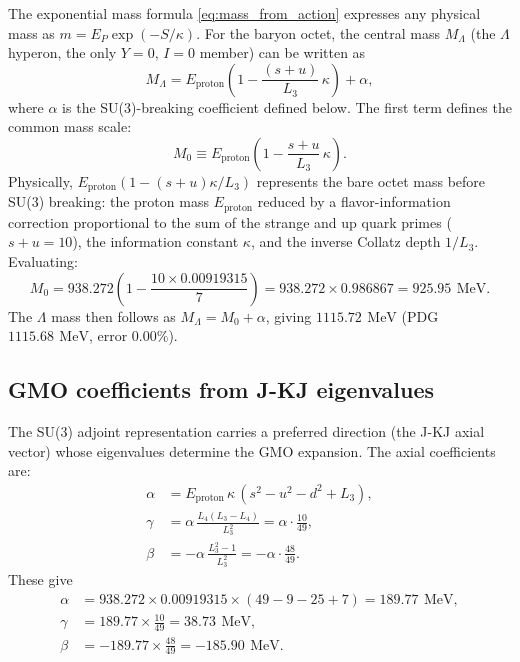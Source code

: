 \documentclass[aps,prd,reprint,twocolumn,showpacs,superscriptaddress]{revtex4-2}
\newcommand{\mev}{\,\text{MeV}}
\begin{document}
The exponential mass formula \eqref{eq:mass_from_action} expresses any
physical mass as $m = E_P\exp(-S/\kappa)$.  For the baryon octet, the
central mass $M_\Lambda$ (the $\Lambda$ hyperon, the only $Y=0,\,I=0$
member) can be written as
\begin{equation}
M_\Lambda = E_{\text{proton}}\left(1 - \frac{(s+u)}{L_3}\,\kappa\right) + \alpha,
\label{eq:M0_derivation}
\end{equation}
where $\alpha$ is the SU(3)-breaking coefficient defined below.
The first term defines the common mass scale:
\begin{equation}
M_0 \equiv E_{\text{proton}}\left(1 - \frac{s+u}{L_3}\,\kappa\right).
\label{eq:M0}
\end{equation}
Physically, $E_{\text{proton}}(1 - (s+u)\kappa/L_3)$ represents the
bare octet mass before SU(3) breaking: the proton mass $E_{\text{proton}}$
reduced by a flavor-information correction proportional to the sum of the
strange and up quark primes ($s+u=10$), the information constant $\kappa$,
and the inverse Collatz depth $1/L_3$.  Evaluating:
\begin{equation}
M_0 = 938.272\left(1 - \frac{10\times 0.00919315}{7}\right)
    = 938.272 \times 0.986867
    = 925.95\ \mev.
\label{eq:M0_value}
\end{equation}
The $\Lambda$ mass then follows as $M_\Lambda = M_0 + \alpha$, giving
$1115.72\ \mev$ (PDG $1115.68\ \mev$, error $0.00\%$).

\subsection{GMO coefficients from J-KJ eigenvalues}

The SU(3) adjoint representation carries a preferred direction
(the J-KJ axial vector) whose eigenvalues determine the GMO expansion.
The axial coefficients are:
\begin{align}
\alpha &= E_{\text{proton}}\,\kappa\,(s^2 - u^2 - d^2 + L_3), \label{eq:alpha} \\
\gamma &= \alpha\,\frac{L_4(L_3 - L_4)}{L_3^2}
       = \alpha \cdot \frac{10}{49}, \label{eq:gamma} \\
\beta  &= -\alpha\,\frac{L_3^2 - 1}{L_3^2}
       = -\alpha \cdot \frac{48}{49}. \label{eq:beta}
\end{align}
These give
\begin{align}
\alpha &= 938.272 \times 0.00919315 \times (49 - 9 - 25 + 7)
       = 189.77\ \mev, \\
\gamma &= 189.77 \times \frac{10}{49} = 38.73\ \mev, \\
\beta  &= -189.77 \times \frac{48}{49} = -185.90\ \mev.
\end{align}
\end{document}
